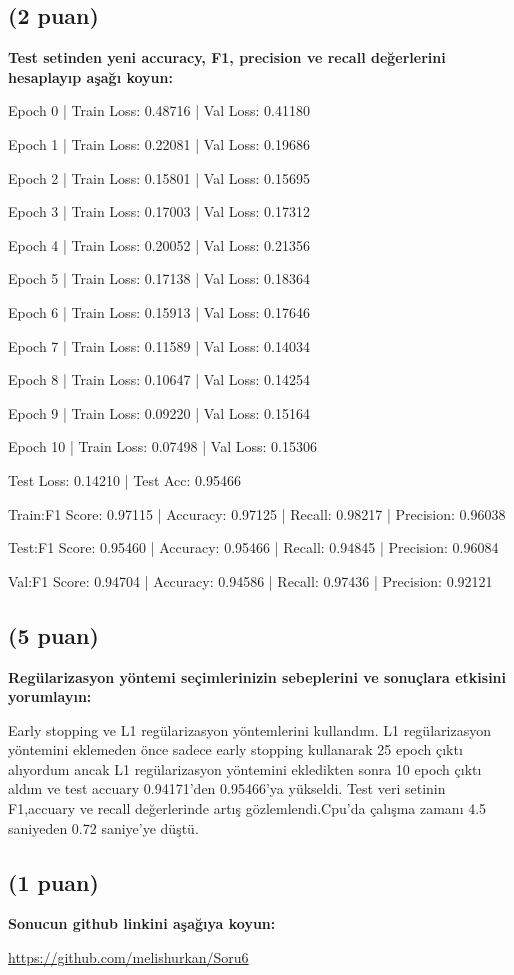 \documentclass[11pt]{article}
\begin{document}
\subsection{(2 puan)} \textbf{Test setinden yeni accuracy, F1, precision ve recall değerlerini hesaplayıp aşağı koyun:}

Epoch 0 | Train Loss: 0.48716 | Val Loss: 0.41180

Epoch 1 | Train Loss: 0.22081 | Val Loss: 0.19686

Epoch 2 | Train Loss: 0.15801 | Val Loss: 0.15695

Epoch 3 | Train Loss: 0.17003 | Val Loss: 0.17312

Epoch 4 | Train Loss: 0.20052 | Val Loss: 0.21356

Epoch 5 | Train Loss: 0.17138 | Val Loss: 0.18364

Epoch 6 | Train Loss: 0.15913 | Val Loss: 0.17646

Epoch 7 | Train Loss: 0.11589 | Val Loss: 0.14034

Epoch 8 | Train Loss: 0.10647 | Val Loss: 0.14254

Epoch 9 | Train Loss: 0.09220 | Val Loss: 0.15164

Epoch 10 | Train Loss: 0.07498 | Val Loss: 0.15306

Test Loss: 0.14210 | Test Acc: 0.95466

Train:F1 Score: 0.97115 | Accuracy: 0.97125 | Recall: 0.98217 | Precision: 0.96038

Test:F1 Score: 0.95460 | Accuracy: 0.95466 | Recall: 0.94845 | Precision: 0.96084

Val:F1 Score: 0.94704 | Accuracy: 0.94586 | Recall: 0.97436 | Precision: 0.92121

\subsection{(5 puan)} \textbf{Regülarizasyon yöntemi seçimlerinizin sebeplerini ve sonuçlara etkisini yorumlayın:}

Early stopping ve L1 regülarizasyon yöntemlerini kullandım. L1 regülarizasyon yöntemini eklemeden önce sadece early stopping kullanarak 25 epoch çıktı alıyordum ancak L1 regülarizasyon yöntemini ekledikten sonra 10 epoch çıktı aldım ve test accuary 0.94171'den 0.95466'ya yükseldi. Test veri setinin F1,accuary ve recall değerlerinde artış gözlemlendi.Cpu'da çalışma zamanı 4.5 saniyeden 0.72 saniye'ye düştü.

\subsection{(1 puan)} \textbf{Sonucun github linkini  aşağıya koyun:}

\url{https://github.com/melishurkan/Soru6}
\end{document}
